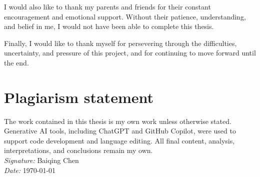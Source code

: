 \documentclass[a4paper,11pt, twoside]{report}
\newcommand{\reportauthor}{Baiqing Chen} %
\begin{document}
I would also like to thank my parents and friends for their constant encouragement and emotional support. Without their patience, understanding, and belief in me, I would not have been able to complete this thesis.

Finally, I would like to thank myself for persevering through the difficulties, uncertainty, and pressure of this project, and for continuing to move forward until the end.

\clearpage

\clearpage
\section*{Plagiarism statement}
The work contained in this thesis is my own work unless otherwise stated. Generative AI tools, including ChatGPT and GitHub Copilot, were used to support code development and language editing. All final content, analysis, interpretations, and conclusions remain my own.\\

\vspace{1em}
\noindent \textit{Signature:} \reportauthor \\
\textit{Date:} \today
\clearpage

\tableofcontents









\appendix




\end{document}
